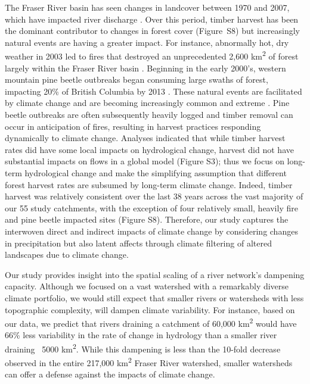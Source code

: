 \documentclass{AGUJournal}
\begin{document}
The Fraser River basin has seen changes in landcover between 1970 and 2007, which have impacted river discharge \citep[e.g.,][]{Zhang:2014}. Over this period, timber harvest has been the dominant contributor to changes in forest cover (Figure~S8) but increasingly natural events are having a greater impact. For instance, abnormally hot, dry weather in 2003 led to fires that destroyed an unprecedented 2,600 km\textsuperscript{2} of forest largely within the Fraser River basin \citep{Filmon:2003}. Beginning in the early 2000's, western mountain pine beetle outbreaks began consuming large swaths of forest, impacting 20\% of British Columbia by 2013 \citep{schnorbus:2010}. These natural events are facilitated by climate change and are becoming increasingly common and extreme \citep{Melillo:2014, Maness:2013}. Pine beetle outbreaks are often subsequently heavily logged and timber removal can occur in anticipation of fires, resulting in harvest practices responding dynamically to climate change. Analyses indicated that while timber harvest rates did have some local impacts on hydrological change, harvest did not have substantial impacts on flows in a global model (Figure S3); thus we focus on long-term hydrological change and make the simplifying assumption that different forest harvest rates are subsumed by long-term climate change. Indeed, timber harvest was relatively consistent over the last 38 years across the vast majority of our 55 study catchments, with the exception of four relatively small, heavily fire and pine beetle impacted sites (Figure S8). Therefore, our study captures the interwoven direct and indirect impacts of climate change by considering changes in precipitation but also latent affects through climate filtering of altered landscapes due to climate change.

Our study provides insight into the spatial scaling of a river network's dampening capacity. Although we focused on a vast watershed with a remarkably diverse climate portfolio, we would still expect that smaller rivers or watersheds with less topographic complexity, will dampen climate variability. For instance, based on our data, we predict that rivers draining a catchment of 60,000 km\textsuperscript{2} would have 66\% less variability in the rate of change in hydrology than a smaller river draining ~5000 km\textsuperscript{2}. While this dampening is less than the 10-fold decrease observed in the entire 217,000 km\textsuperscript{2} Fraser River watershed, smaller watersheds can offer a defense against the impacts of climate change.
\end{document}
